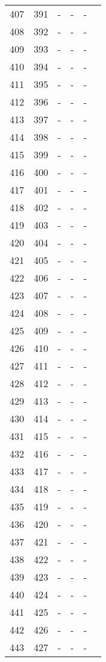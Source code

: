 \documentclass[10pt]{article}
\begin{document}
\begin{longtable}{llllll}
  407 & 391 & - & - & - &  \\ 
  408 & 392 & - & - & - &  \\ 
  409 & 393 & - & - & - &  \\ 
  410 & 394 & - & - & - &  \\ 
  411 & 395 & - & - & - &  \\ 
  412 & 396 & - & - & - &  \\ 
  413 & 397 & - & - & - &  \\ 
  414 & 398 & - & - & - &  \\ 
  415 & 399 & - & - & - &  \\ 
  416 & 400 & - & - & - &  \\ 
  417 & 401 & - & - & - &  \\ 
  418 & 402 & - & - & - &  \\ 
  419 & 403 & - & - & - &  \\ 
  420 & 404 & - & - & - &  \\ 
  421 & 405 & - & - & - &  \\ 
  422 & 406 & - & - & - &  \\ 
  423 & 407 & - & - & - &  \\ 
  424 & 408 & - & - & - &  \\ 
  425 & 409 & - & - & - &  \\ 
  426 & 410 & - & - & - &  \\ 
  427 & 411 & - & - & - &  \\ 
  428 & 412 & - & - & - &  \\ 
  429 & 413 & - & - & - &  \\ 
  430 & 414 & - & - & - &  \\ 
  431 & 415 & - & - & - &  \\ 
  432 & 416 & - & - & - &  \\ 
  433 & 417 & - & - & - &  \\ 
  434 & 418 & - & - & - &  \\ 
  435 & 419 & - & - & - &  \\ 
  436 & 420 & - & - & - &  \\ 
  437 & 421 & - & - & - &  \\ 
  438 & 422 & - & - & - &  \\ 
  439 & 423 & - & - & - &  \\ 
  440 & 424 & - & - & - &  \\ 
  441 & 425 & - & - & - &  \\ 
  442 & 426 & - & - & - &  \\ 
  443 & 427 & - & - & - &  \\ 

\end{longtable}
\end{document}
